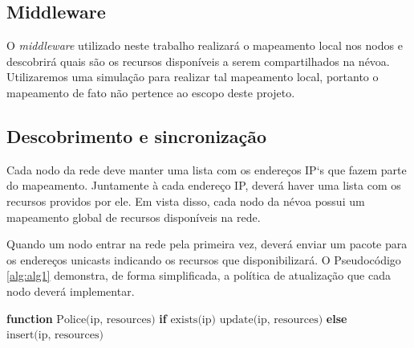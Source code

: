 \subsection{Middleware}

O \textit{middleware} utilizado neste trabalho realizará o mapeamento local nos nodos e descobrirá quais são os recursos disponíveis a serem compartilhados na névoa.
Utilizaremos uma simulação para realizar tal mapeamento local, portanto o mapeamento de fato não pertence ao escopo deste projeto.


\subsection{Descobrimento e sincronização}

Cada nodo da rede deve manter uma lista com os endereços IP`s que fazem parte do mapeamento. Juntamente à cada endereço IP, deverá haver uma lista com os recursos providos por ele.
Em vista disso, cada nodo da névoa possui um mapeamento global de recursos disponíveis na rede.

Quando um nodo entrar na rede pela primeira vez, deverá enviar um pacote para os endereços unicasts indicando os recursos que disponibilizará.
O Pseudocódigo \ref{alg:alg1} demonstra, de forma simplificada, a política de atualização que cada nodo deverá implementar.


\begin{algorithm}[htb]
    \begin{center}
        \begin{algorithmic}[1]
            \STATE \textbf{function} $\text{Police(ip, resources)}$
            \STATE \hspace{\algorithmicindent} \textbf{if} $\text{exists(ip)}$
            \STATE \hspace{\algorithmicindent} \hspace{\algorithmicindent} $\text{update(ip, resources)}$
            \STATE \hspace{\algorithmicindent} \textbf{else}
            \STATE \hspace{\algorithmicindent} \hspace{\algorithmicindent} $\text{insert(ip, resources)}$
        \end{algorithmic}
    \end{center}
    \caption[Política de atualização de recursos]%
        {\label{alg:alg1} Política de atualização de recursos.}%
    \end{algorithm}



